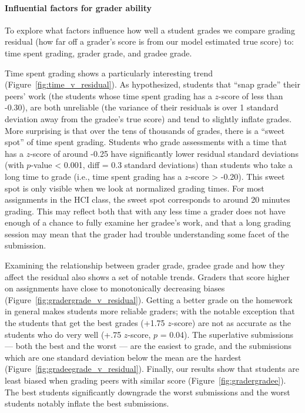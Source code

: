 \paragraph{Influential factors for grader ability} 
To explore what
factors influence how well a student grades we compare
grading residual (how far off a grader's score is from our
model estimated true score) to: time spent grading, grader grade, and gradee grade. 

Time spent grading shows a particularly interesting trend
(Figure~\ref{fig:time_v_residual}). As hypothesized, students that ``snap grade''
their peers' work (the students whose time spent grading has
a $z$-score of less than -0.30), are both unreliable (the
variance of their residuals is over 1 standard deviation
away from the gradee's true score) and tend to slightly
inflate grades. More surprising is that over the tens of
thousands of grades, there is a ``sweet spot'' of time spent
grading. Students who grade assessments with
a time that has a $z$-score of around -0.25 have significantly
lower residual standard deviations (with $p$-value < 0.001, diff = 0.3 standard
deviations) than students who take a long time to grade
(i.e., time spent grading has a $z$-score > -0.20). This sweet
spot is only visible when we look at normalized grading
times. For most assignments in the HCI class, the sweet
spot corresponds to around 20 minutes grading. This may reflect both that with any less time a grader does 
not have enough of a chance to fully examine her gradee's work, and that 
a long grading session may mean that the grader had trouble understanding 
some facet of the submission. %

Examining the relationship between grader grade, gradee
grade and how they affect the residual also shows a set of
notable trends. Graders that score higher on assignments
have close to monotonically decreasing biases (Figure~\ref{fig:gradergrade_v_residual}).
Getting a better grade on the homework in general makes
students more reliable graders; with the notable exception
that the students that get the best grades (+1.75 $z$-score)
are not as accurate as the students who do very well (+.75
$z$-score, $p$ = 0.04). The superlative submissions --- both the
best and the worst --- are the easiest to grade, and the submissions which are one standard deviation below the mean
are the hardest (Figure~\ref{fig:gradeegrade_v_residual}). Finally, our results show
that students are least biased when grading peers with
similar score (Figure~\ref{fig:gradergradee}). The best students significantly
downgrade the worst submissions and the worst students
notably inflate the best submissions.

